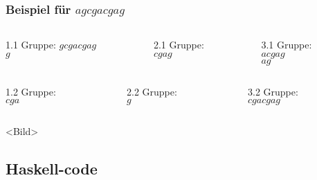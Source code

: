 \documentclass{beamer}
\begin{document}

\begin{frame}[t]
\frametitle{Beispiel für $agcgacgag$}
\begin{columns}
    \begin{column}[t]{0.3\textwidth}
        1.1 Gruppe:  
        $gcgacgag$ \\  
        $g$        \\  
    \end{column}
    \begin{column}[t]{0.3\textwidth}
        2.1 Gruppe: \\
        $cgag$      \\
    \end{column}
    \begin{column}[t]{0.3\textwidth}
        3.1 Gruppe: \\
        $acgag$     \\
        $ag$        \\
    \end{column}
\end{columns}
\medskip
\begin{columns}
    \begin{column}[t]{0.3\textwidth}
        1.2 Gruppe:\\
        $cga$      \\  
    \end{column}
    \begin{column}[t]{0.3\textwidth}
        2.2 Gruppe: \\
        $g$         \\
    \end{column}
    \begin{column}[t]{0.3\textwidth}
        3.2 Gruppe: \\
        $cgacgag$   \\
    \end{column}
\end{columns}
\medskip
<Bild>
\end{frame}


\subsection{Haskell-code}
\end{document}
